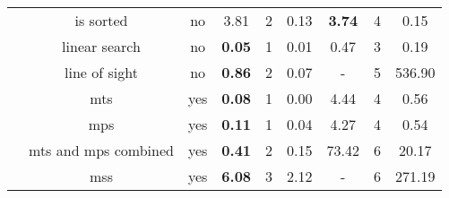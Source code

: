 \begin{table}
{\begin{tabular}[h]{|c|c|c|c|c|c||c|c|c|}
			 & is sorted & no & 3.81 & 2 & 0.13 & {\bfseries 3.74} & 4 & 0.15\\ 
			 & linear search & no & {\bfseries 0.05} & 1 & 0.01 & 0.47 & 3 & 0.19\\ 
			 & line of sight & no & {\bfseries 0.86} & 2 & 0.07 & - & 5 & 536.90\\ 
			 & mts & yes & {\bfseries 0.08} & 1 & 0.00 & 4.44 & 4 & 0.56\\ 
			 & mps & yes & {\bfseries 0.11} & 1 & 0.04 & 4.27 & 4 & 0.54\\ 
			 & mts and mps combined & yes & {\bfseries 0.41} & 2 & 0.15 & 73.42 & 6 & 20.17\\ 
			 & mss & yes & {\bfseries 6.08} & 3 & 2.12 & - & 6 & 271.19\\ 
			\hline
		\end{tabular}
	}
\end{table}

